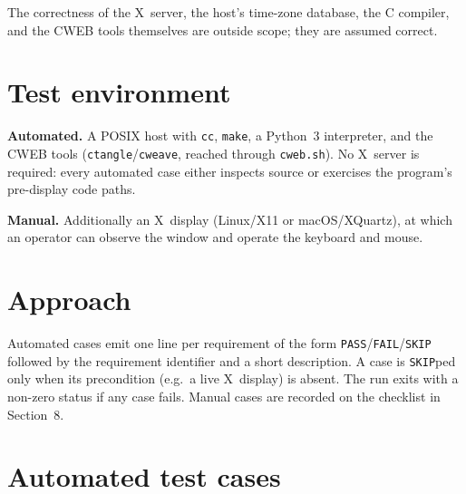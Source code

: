 \documentclass[12pt]{article}
\newcommand{\code}[1]{\texttt{#1}}
\begin{document}
The correctness of the X~server, the host's time-zone database, the C
compiler, and the CWEB tools themselves are outside scope; they are
assumed correct.

\section{Test environment}

\textbf{Automated.}  A POSIX host with \code{cc}, \code{make}, a Python~3
interpreter, and the CWEB tools (\code{ctangle}/\code{cweave}, reached
through \code{cweb.sh}).  No X~server is required: every automated case
either inspects source or exercises the program's pre-display code paths.

\medskip\noindent
\textbf{Manual.}  Additionally an X~display (Linux/X11 or macOS/XQuartz),
at which an operator can observe the window and operate the keyboard and
mouse.

\section{Approach}

Automated cases emit one line per requirement of the form
\code{PASS}/\code{FAIL}/\code{SKIP} followed by the requirement identifier
and a short description.  A case is \code{SKIP}ped only when its
precondition (e.g.\ a live X~display) is absent.  The run exits with a
non-zero status if any case fails.  Manual cases are recorded on the
checklist in Section~8.

\section{Automated test cases}
\end{document}

